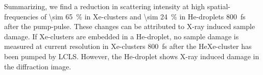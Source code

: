 %
Summarizing, we find a reduction in scattering intensity at high spatial-frequencies of \SI{\sim 65}{\percent} in Xe-clusters and \SI{\sim 24}{\percent} in He-droplets \SI{800}{\femto\second} after the pump-pulse. These changes can be attributed to X-ray induced sample damage. If Xe-clusters are embedded in a He-droplet, no sample damage is measured at current resolution in Xe-clusters \SI{800}{\femto\second} after the HeXe-cluster has been pumped by LCLS. However, the He-droplet shows X-ray induced damage in the diffraction image.
%
%
%
%
%
%
%
%
%
%
%
%
